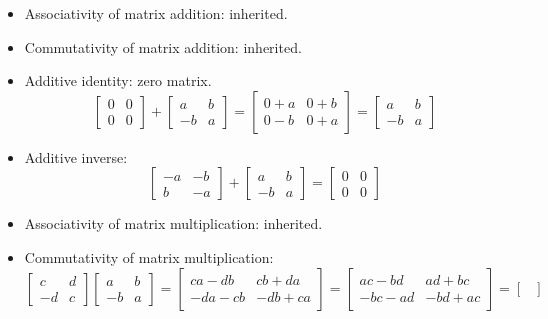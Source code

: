 \documentclass{amsart}
\begin{document}
	\begin{itemize}
		\item Associativity of matrix addition: inherited.
		\item Commutativity of matrix addition: inherited.
		\item Additive identity: zero matrix.
		$$ \begin{bmatrix}
		0 & 0 \\
		0 & 0
		\end{bmatrix} +
		\begin{bmatrix}
		a & b \\
		-b & a
		\end{bmatrix} = \begin{bmatrix}
		0+a & 0+b \\
		0-b & 0+a
		\end{bmatrix} = \begin{bmatrix}
		a & b \\
		-b & a
		\end{bmatrix}$$
		\item Additive inverse:
		$$ \begin{bmatrix}
		-a & -b \\
		b & -a
		\end{bmatrix} +
		\begin{bmatrix}
		a & b \\
		-b & a
		\end{bmatrix} = \begin{bmatrix}
		0 & 0 \\
		0 & 0
		\end{bmatrix} $$
		\item Associativity of matrix multiplication: inherited.
		\item Commutativity of matrix multiplication:
		$$ \begin{bmatrix}
		c & d \\
		-d & c
		\end{bmatrix} 
		\begin{bmatrix}
		a & b \\
		-b & a
		\end{bmatrix} = \begin{bmatrix}
		ca-db & cb+da \\
		-da-cb & -db+ca
		\end{bmatrix} = \begin{bmatrix}
		ac-bd & ad+bc \\
		-bc-ad & -bd+ac
		\end{bmatrix} = 
		\begin{bmatrix}

\end{bmatrix}$$
\end{itemize}
\end{document}
